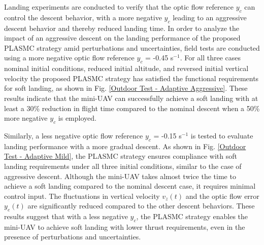 \documentclass{IEEEtaes}
\begin{document}
Landing experiments are conducted to verify that the optic flow reference $y_c$ can control the descent behavior, with a more negative $y_c$ leading to an aggressive descent behavior and thereby reduced landing time.
In order to analyze the impact of an aggressive descent on the landing performance of the proposed PLASMC strategy amid perturbations and uncertainties, field tests are conducted using a more negative optic flow reference $y_c$ = -0.45 s$^{-1}$.
For all three cases \textemdash nominal initial conditions, reduced initial altitude, and reversed initial vertical velocity \textemdash the proposed PLASMC strategy has satisfied the functional requirements for soft landing, as shown in Fig. \ref{Outdoor Test - Adaptive Aggressive}.
These results indicate that the mini-UAV can successfully achieve a soft landing with at least a 30\% reduction in flight time compared to the nominal descent when a 50\% more negative $y_c$ is employed.

Similarly, a less negative optic flow reference $y_c$ = -0.15 s$^{-1}$ is tested to evaluate landing performance with a more gradual descent.
As shown in Fig. \ref{Outdoor Test - Adaptive Mild}, the PLASMC strategy ensures compliance with soft landing requirements under all three initial conditions, similar to the case of aggressive descent.
Although the mini-UAV takes almost twice the time to achieve a soft landing compared to the nominal descent case, it requires minimal control input.
The fluctuations in vertical velocity $v_z(t)$ and the optic flow error $y_e(t)$ are significantly reduced compared to the other descent behaviors.
These results suggest that with a less negative $y_c$, the PLASMC strategy enables the mini-UAV to achieve soft landing with lower thrust requirements, even in the presence of perturbations and uncertainties.
\end{document}
